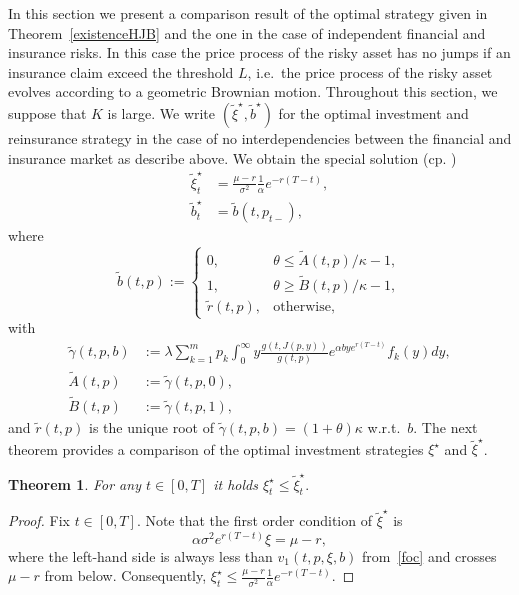 \documentclass[reqno, 11pt]{amsart}%
\newtheorem{theorem}{Theorem}
\theoremstyle{definition}
\numberwithin{equation}{section} \numberwithin{theorem}{section}
\begin{document}
In this section we present a comparison result of the optimal strategy given in Theorem~\ref{existenceHJB} and the one in the case of independent financial and insurance risks. In this case the price process of the risky asset has no jumps if an insurance claim exceed the threshold $L$, i.e.\ the price process of the risky asset evolves according to a geometric Brownian motion. 
Throughout this section, we suppose that $K$ is large.
We write $(\tilde\xi^\star,\tilde b^\star)$ for the optimal investment and reinsurance strategy in the case of no interdependencies between the financial and insurance market as describe above. 
We obtain the special solution (cp. \cite[Ch.\,6]{gl20})
\begin{align*}
\tilde\xi^\star_t &= \frac{\mu-r}{\sigma^2}\frac{1}{\alpha}e^{-r(T-t)},\\
\tilde b^\star_t &= \tilde b(t,p_{t-}),
\end{align*}
where
\begin{equation*}
\tilde b(t,p) := \begin{cases} 0, & \theta\le \tilde A(t,p)/\kappa-1,\\
1, &\theta\ge \tilde B(t,p)/\kappa-1, \\
\tilde r(t,p), &\text{otherwise},
\end{cases}
\end{equation*}
with
\begin{align*}
  \tilde\gamma(t,p,b) &:= \lambda\sum_{k=1}^m p_k \int_0^\infty y \frac{g(t,J(p,y))}{g(t,p)} e^{\alpha b y e^{r(T-t)}} f_k(y)dy, \\
   \tilde A(t,p) &:= \tilde\gamma(t,p,0), \\
   \tilde B(t,p) &:= \tilde\gamma(t,p,1),
\end{align*}
and $\tilde r(t,p)$ is the unique root of $\tilde\gamma(t,p,b)=(1+\theta)\kappa$ w.r.t.\ $b$.
The next theorem provides a comparison of the optimal investment strategies $\xi^\star$ and $\tilde\xi^\star$.

\begin{theorem}\label{comparison}
   For any $t\in[0,T]$ it holds $  \xi^\star_t \le \tilde\xi^\star_t.$
\end{theorem}

\begin{proof}
  Fix $t\in[0,T]$. Note that the first order condition of $\tilde\xi^\star$ is
  \begin{equation*}
  \alpha\sigma^2 e^{r(T-t)}\xi=\mu-r,
  \end{equation*}
  where the left-hand side is always less than $v_1(t,p,\xi,b)$ from~\eqref{foc} and crosses $\mu-r$ from below.
  Consequently, $\xi_t^\star\le \frac{\mu-r}{\sigma^2}\frac{1}{\alpha}e^{-r(T-t)} $. 
\end{proof}
\end{document}
